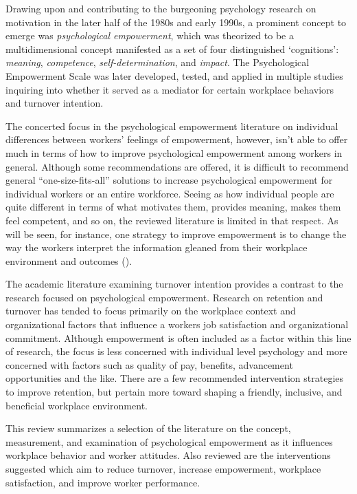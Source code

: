 \documentclass[
  11pt,
  a4paper,
]{article}
\begin{document}
Drawing upon and contributing to the burgeoning psychology research on
motivation in the later half of the 1980s and early 1990s, a prominent
concept to emerge was \emph{psychological empowerment}, which was
theorized to be a multidimensional concept manifested as a set of four
distinguished `cognitions': \emph{meaning}, \emph{competence},
\emph{self-determination}, and \emph{impact}. The Psychological
Empowerment Scale was later developed, tested, and applied in multiple
studies inquiring into whether it served as a mediator for certain
workplace behaviors and turnover intention.

The concerted focus in the psychological empowerment literature on
individual differences between workers' feelings of empowerment,
however, isn't able to offer much in terms of how to improve
psychological empowerment among workers in general. Although some
recommendations are offered, it is difficult to recommend general
``one-size-fits-all'' solutions to increase psychological empowerment
for individual workers or an entire workforce. Seeing as how individual
people are quite different in terms of what motivates them, provides
meaning, makes them feel competent, and so on, the reviewed literature
is limited in that respect. As will be seen, for instance, one strategy
to improve empowerment is to change the way the workers interpret the
information gleaned from their workplace environment and outcomes
().

The academic literature examining turnover intention provides a contrast
to the research focused on psychological empowerment. Research on
retention and turnover has tended to focus primarily on the workplace
context and organizational factors that influence a workers job
satisfaction and organizational commitment. Although empowerment is
often included as a factor within this line of research, the focus is
less concerned with individual level psychology and more concerned with
factors such as quality of pay, benefits, advancement opportunities and
the like. There are a few recommended intervention strategies to improve
retention, but pertain more toward shaping a friendly, inclusive, and
beneficial workplace environment.

This review summarizes a selection of the literature on the concept,
measurement, and examination of psychological empowerment as it
influences workplace behavior and worker attitudes. Also reviewed are
the interventions suggested which aim to reduce turnover, increase
empowerment, workplace satisfaction, and improve worker performance.
\end{document}
